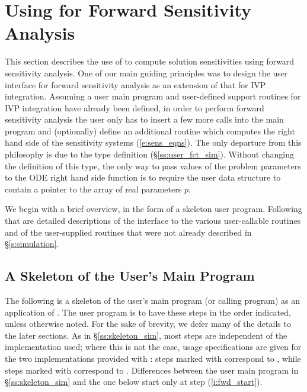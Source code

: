 \section{Using {\cvodes} for Forward Sensitivity Analysis}\label{s:forward}

This section describes the use of {\cvodes} to compute solution sensitivities using
forward sensitivity analysis. One of our main guiding principles was to design 
the {\cvodes} user interface for forward sensitivity analysis as an extension of
that for IVP integration. Assuming a user main program and user-defined support 
routines for IVP integration have already been defined, in order to perform 
forward sensitivity analysis the user only has to insert a few more calls 
into the main program and (optionally) define an additional routine which
computes the right hand side of the sensitivity systems (\ref{e:sens_eqns}). 
The only departure from this philosophy is due to the  type definition
(\S\ref{ss:user_fct_sim}). Without changing the definition of this type, the
only way to pass values of the problem parameters to the ODE right hand side
function is to require the user data structure  to contain a pointer
to the array of real parameters $p$.

We begin with a brief overview, in the form of a skeleton user program.
Following that are detailed descriptions of the interface to the
various user-callable routines and of the user-supplied routines that were not already
described in \S\ref{s:simulation}.

\subsection{A Skeleton of the User's Main Program}\label{ss:forward_usage}

The following is a skeleton of the user's main program (or calling
program) as an application of {\cvodes}. The user program is to have these 
steps in the order indicated, unless otherwise noted.
For the sake of brevity, we defer many of the details to the later sections.
As in \S\ref{ss:skeleton_sim}, most steps are independent of the {\nvector}
implementation used; where this is not the case, usage specifications are given for the
two implementations provided with {\cvodes}: steps marked with {\p} correspond to 
{\nvecp}, while steps marked with {\s} correspond to {\nvecs}.
Differences between the user main program in \S\ref{ss:skeleton_sim} and
the one below start only at step (\ref{i:fwd_start}).

